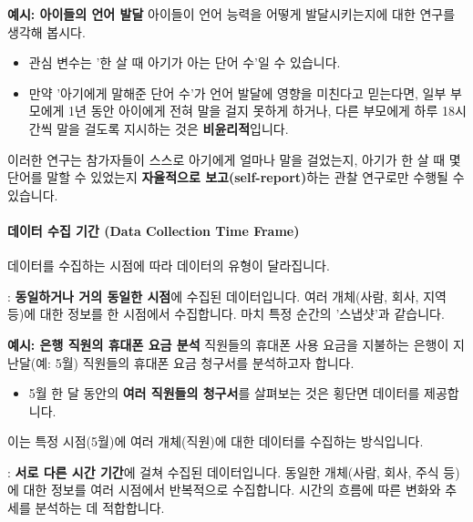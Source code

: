 \documentclass[11pt,a4paper]{article}
\begin{document}
\begin{examplebox}
\textbf{예시: 아이들의 언어 발달}
아이들이 언어 능력을 어떻게 발달시키는지에 대한 연구를 생각해 봅시다.
\begin{itemize}
    \item 관심 변수는 '한 살 때 아기가 아는 단어 수'일 수 있습니다.
    \item 만약 '아기에게 말해준 단어 수'가 언어 발달에 영향을 미친다고 믿는다면, 일부 부모에게 1년 동안 아이에게 전혀 말을 걸지 못하게 하거나, 다른 부모에게 하루 18시간씩 말을 걸도록 지시하는 것은 \textbf{비윤리적}입니다.
\end{itemize}
이러한 연구는 참가자들이 스스로 아기에게 얼마나 말을 걸었는지, 아기가 한 살 때 몇 단어를 말할 수 있었는지 \textbf{자율적으로 보고(self-report)}하는 관찰 연구로만 수행될 수 있습니다.
\end{examplebox}

\paragraph{데이터 수집 기간 (Data Collection Time Frame)}
데이터를 수집하는 시점에 따라 데이터의 유형이 달라집니다.

\begin{tcolorbox}[mybox, title={데이터 수집 기간 (1/2): 횡단면 데이터 (Cross-Sectional Data)}]
: \textbf{동일하거나 거의 동일한 시점}에 수집된 데이터입니다. 여러 개체(사람, 회사, 지역 등)에 대한 정보를 한 시점에서 수집합니다. 마치 특정 순간의 '스냅샷'과 같습니다.
\end{tcolorbox}

\begin{examplebox}
\textbf{예시: 은행 직원의 휴대폰 요금 분석}
직원들의 휴대폰 사용 요금을 지불하는 은행이 지난달(예: 5월) 직원들의 휴대폰 요금 청구서를 분석하고자 합니다.
\begin{itemize}
    \item 5월 한 달 동안의 \textbf{여러 직원들의 청구서}를 살펴보는 것은 횡단면 데이터를 제공합니다.
\end{itemize}
이는 특정 시점(5월)에 여러 개체(직원)에 대한 데이터를 수집하는 방식입니다.
\end{examplebox}

\begin{tcolorbox}[mybox, title={데이터 수집 기간 (2/2): 시계열 데이터 (Time-Series Data)}]
: \textbf{서로 다른 시간 기간}에 걸쳐 수집된 데이터입니다. 동일한 개체(사람, 회사, 주식 등)에 대한 정보를 여러 시점에서 반복적으로 수집합니다. 시간의 흐름에 따른 변화와 추세를 분석하는 데 적합합니다.
\end{tcolorbox}
\end{document}
